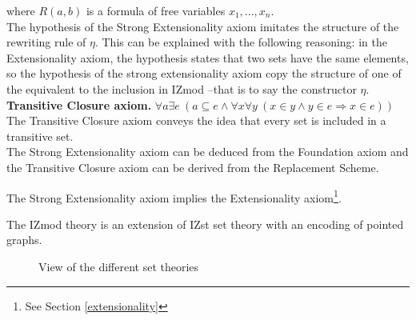 \documentclass[submission,copyright,creativecommons]{eptcs}
\def\imp{\mathbin{\Rightarrow}}
\def\fa{{\forall}}
\def\conj{\mathbin{\wedge}}
\def\ex{{\exists}}
\begin{document}
where $R(a,b)$ is a formula of free variables $x_1, ..., x_n$. \\

The hypothesis of the Strong Extensionality axiom imitates the structure of the rewriting rule of $\eta$. This can be explained with the following reasoning: in the Extensionality axiom, the hypothesis states that two sets have the same elements, so the hypothesis of the strong extensionality axiom copy the structure of one of the equivalent to the inclusion in IZmod --that is to say the constructor $\eta$. \\

\textbf{Transitive Closure axiom.} $\fa a\ex e~(a \subseteq e \conj \fa x\fa y~(x \in y \conj y \in e \imp x \in e))$ \\

The Transitive Closure axiom conveys the idea that every set is included in a transitive set. \\

The Strong Extensionality axiom can be deduced from the Foundation axiom and the Transitive Closure axiom can be derived from the Replacement Scheme.

The Strong Extensionality axiom implies the Extensionality axiom\footnote{See Section \ref{extensionality}}.

The IZmod theory is an extension of IZst set theory with an encoding of pointed graphs.

\begin{figure}[h]
\centering
{}
\caption{View of the different set theories}
\end{figure}
\end{document}
